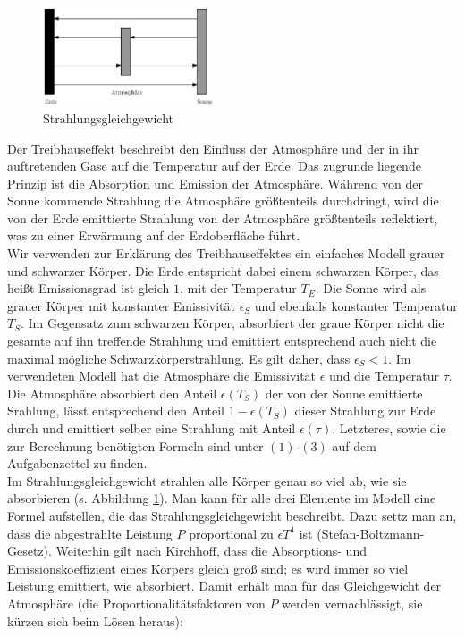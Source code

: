 \documentclass[10pt,a4paper]{article}
\begin{document}
\begin{figure}
\centering
\includegraphics[width=0.45\textwidth]{./figures/strahlungsgleichgewicht.eps}
\caption{Strahlungsgleichgewicht}
\label{fig:strahlungsgleichgewicht}
\end{figure}

Der Treibhauseffekt beschreibt den Einfluss der Atmosphäre und der in ihr auftretenden Gase auf die Temperatur auf der Erde. Das zugrunde liegende Prinzip ist die Absorption und Emission der Atmosphäre. Während von der Sonne kommende Strahlung die Atmosphäre größtenteils durchdringt, wird die von der Erde emittierte Strahlung von der Atmosphäre größtenteils reflektiert, was zu einer Erwärmung auf der Erdoberfläche führt.\\
Wir verwenden zur Erklärung des Treibhauseffektes ein einfaches Modell grauer und schwarzer Körper. Die Erde entspricht dabei einem schwarzen Körper, das heißt Emissionsgrad ist gleich $1$, mit der Temperatur $T_E$. Die Sonne wird als grauer Körper mit konstanter Emissivität $\epsilon_S$ und ebenfalls konstanter Temperatur $T_S$. Im Gegensatz zum schwarzen Körper, absorbiert der graue Körper nicht die gesamte auf ihn treffende Strahlung und emittiert entsprechend auch nicht die maximal mögliche Schwarzkörperstrahlung. Es gilt daher, dass $\epsilon_{S}<1$. Im verwendeten Modell hat die Atmosphäre die Emissivität $\epsilon$ und die Temperatur $\tau$. 
Die Atmosphäre absorbiert den Anteil $\epsilon(T_S)$ der von der Sonne emittierte Srahlung, lässt entsprechend den Anteil $1-\epsilon(T_S)$ dieser Strahlung zur Erde durch und emittiert selber eine Strahlung mit Anteil $\epsilon(\tau)$. Letzteres, sowie die zur Berechnung benötigten Formeln sind unter $(1)$-$(3)$ auf dem Aufgabenzettel zu finden.
\\
Im Strahlungsgleichgewicht strahlen alle Körper genau so viel ab, wie sie absorbieren (s. Abbildung \ref{fig:strahlungsgleichgewicht}). Man kann für alle drei Elemente im Modell eine Formel aufstellen, die das Strahlungsgleichgewicht beschreibt. Dazu settz man an, dass die abgestrahlte Leistung $P$ proportional zu $\epsilon T^4$ ist (Stefan-Boltzmann-Gesetz). Weiterhin gilt nach Kirchhoff, dass die Absorptions- und Emissionskoeffizient eines Körpers gleich groß sind; es wird immer so viel Leistung emittiert, wie absorbiert. Damit erhält man für das Gleichgewicht der Atmosphäre (die Proportionalitätsfaktoren von $P$ werden vernachlässigt, sie kürzen sich beim Lösen heraus):
\end{document}
